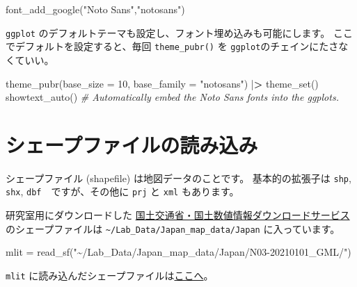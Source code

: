 \documentclass[
]{book}
\newenvironment{Shaded}{\begin{snugshade}}{\end{snugshade}}
\newcommand{\AttributeTok}[1]{\textcolor[rgb]{0.77,0.63,0.00}{#1}}
\newcommand{\CommentTok}[1]{\textcolor[rgb]{0.56,0.35,0.01}{\textit{#1}}}
\newcommand{\DecValTok}[1]{\textcolor[rgb]{0.00,0.00,0.81}{#1}}
\newcommand{\ErrorTok}[1]{\textcolor[rgb]{0.64,0.00,0.00}{\textbf{#1}}}
\newcommand{\FunctionTok}[1]{\textcolor[rgb]{0.00,0.00,0.00}{#1}}
\newcommand{\NormalTok}[1]{#1}
\newcommand{\OtherTok}[1]{\textcolor[rgb]{0.56,0.35,0.01}{#1}}
\newcommand{\SpecialCharTok}[1]{\textcolor[rgb]{0.00,0.00,0.00}{#1}}
\newcommand{\StringTok}[1]{\textcolor[rgb]{0.31,0.60,0.02}{#1}}
\theoremstyle{definition}
\theoremstyle{definition}
\theoremstyle{definition}
\theoremstyle{definition}
\theoremstyle{remark}
\begin{document}
\begin{Shaded}
\begin{Highlighting}[]
\FunctionTok{font\_add\_google}\NormalTok{(}\StringTok{"Noto Sans"}\NormalTok{,}\StringTok{"notosans"}\NormalTok{)}
\end{Highlighting}
\end{Shaded}

\texttt{ggplot} のデフォルトテーマも設定し、フォント埋め込みも可能にします。
ここでデフォルトを設定すると、毎回 \texttt{theme\_pubr()} を \texttt{ggplot}のチェインにたさなくていい。

\begin{Shaded}
\begin{Highlighting}[]
\FunctionTok{theme\_pubr}\NormalTok{(}\AttributeTok{base\_size =} \DecValTok{10}\NormalTok{, }\AttributeTok{base\_family =} \StringTok{"notosans"}\NormalTok{) }\SpecialCharTok{|}\ErrorTok{\textgreater{}} \FunctionTok{theme\_set}\NormalTok{()}
\FunctionTok{showtext\_auto}\NormalTok{() }\CommentTok{\# Automatically embed the Noto Sans fonts into the ggplots.}
\end{Highlighting}
\end{Shaded}

\hypertarget{ux30b7ux30a7ux30fcux30d7ux30d5ux30a1ux30a4ux30ebux306eux8aadux307fux8fbcux307f}{%
\section{シェープファイルの読み込み}\label{ux30b7ux30a7ux30fcux30d7ux30d5ux30a1ux30a4ux30ebux306eux8aadux307fux8fbcux307f}}

シェープファイル (shapefile) は地図データのことです。
基本的の拡張子は \texttt{shp}, \texttt{shx}, \texttt{dbf}　ですが、その他に \texttt{prj} と \texttt{xml} もあります。

研究室用にダウンロードした \href{https://nlftp.mlit.go.jp/ksj/index.html}{国土交通省・国土数値情報ダウンロードサービス} のシェープファイルは \texttt{\textasciitilde{}/Lab\_Data/Japan\_map\_data/Japan} に入っています。

\begin{Shaded}
\begin{Highlighting}[]
\NormalTok{mlit }\OtherTok{=} \FunctionTok{read\_sf}\NormalTok{(}\StringTok{"\textasciitilde{}/Lab\_Data/Japan\_map\_data/Japan/N03{-}20210101\_GML/"}\NormalTok{)}
\end{Highlighting}
\end{Shaded}

\texttt{mlit} に読み込んだシェープファイルは\href{https://nlftp.mlit.go.jp/ksj/gml/datalist/KsjTmplt-N03-v3_0.html}{ここへ}。
\end{document}
